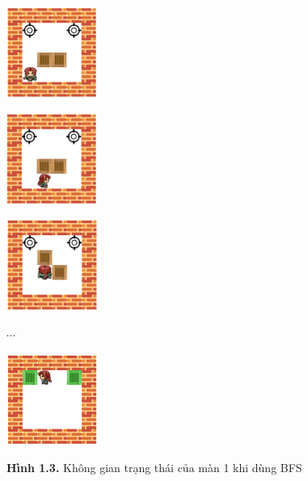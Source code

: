 \documentclass[a4paper,12pt]{article}
\begin{document}
\begin{figure}[h]
    \centering
    \begin{minipage}{0.2\textwidth}
        \centering
        \includegraphics[width=3cm]{Level_1_render.png} 
        \label{fig:image1}
    \end{minipage}
    \begin{minipage}{0.2\textwidth}
        \centering
        \includegraphics[width=3cm]{Level_1.1.png} 
        \label{fig:image2}
    \end{minipage}
    \begin{minipage}{0.2\textwidth}
        \centering
        \includegraphics[width=3cm]{Level_1.2.png} 
        \label{fig:image3}
    \end{minipage}
    $\cdots$
    \begin{minipage}{0.2\textwidth}
        \centering
        \includegraphics[width=3cm]{Level_1_end.png}
        \label{fig:image4}
    \end{minipage}
    \caption*{\textbf{Hình 1.3.} Không gian trạng thái của màn 1 khi dùng BFS}
\end{figure}
\end{document}
